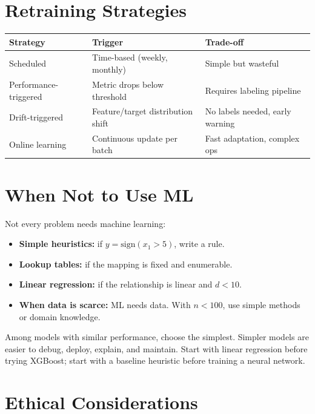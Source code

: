 \section{Retraining Strategies}

\begin{longtable}{p{3cm}p{4cm}p{5cm}}
	\toprule
	\textbf{Strategy}     & \textbf{Trigger}                  & \textbf{Trade-off}              \\
	\midrule
	Scheduled             & Time-based (weekly, monthly)      & Simple but wasteful             \\
	Performance-triggered & Metric drops below threshold      & Requires labeling pipeline      \\
	Drift-triggered       & Feature/target distribution shift & No labels needed, early warning \\
	Online learning       & Continuous update per batch       & Fast adaptation, complex ops    \\
	\bottomrule
\end{longtable}

\section{When Not to Use ML}

Not every problem needs machine learning:

\begin{itemize}
	\item \textbf{Simple heuristics:} if $y = \text{sign}(x_1 > 5)$, write a rule.
	\item \textbf{Lookup tables:} if the mapping is fixed and enumerable.
	\item \textbf{Linear regression:} if the relationship is linear and $d < 10$.
	\item \textbf{When data is scarce:} ML needs data. With $n < 100$, use simple methods or domain knowledge.
\end{itemize}

\begin{principle}
	Among models with similar performance, choose the simplest. Simpler models are easier to debug, deploy, explain, and maintain. Start with linear regression before trying XGBoost; start with a baseline heuristic before training a neural network.
\end{principle}

\section{Ethical Considerations}

